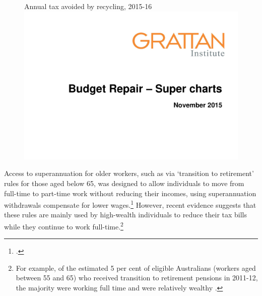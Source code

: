 \documentclass{grattanAlpha}
\begin{document}
\begin{figure}
%
{Annual tax avoided by recycling, 2015-16}
\includegraphics[width=\columnwidth,page=49]{super-atlas/PPTX.pdf}

\end{figure}

Access to superannuation for older workers, such as via ‘transition to retirement’ rules for those aged below 65, was designed to allow individuals to move from full-time to part-time work without reducing their incomes, using superannuation withdrawals compensate for lower wages.\footcite{ASIC2015TransitionToRetirement}  However, recent evidence suggests that these rules are mainly used by high-wealth individuals to reduce their tax bills while they continue to work full-time.\footnote{For example, of the estimated 5 per cent of eligible Australians (workers aged between 55 and 65) who received transition to retirement pensions in 2011-12, the majority were working full time and were relatively wealthy \textcite[][20]{ProductivityCommission2015SuperPolicyPostRetirement}.}
\end{document}
